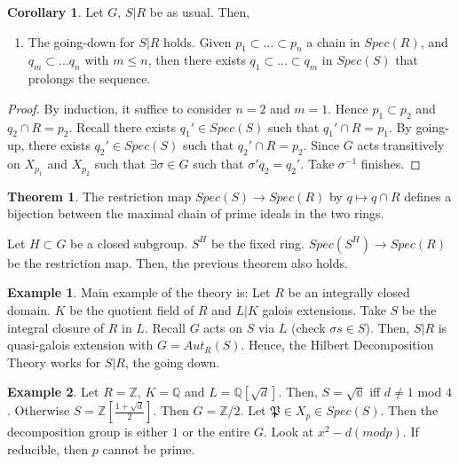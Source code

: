 \documentclass{article}
\theoremstyle{definition}
\newtheorem{theorem}{Theorem}[section]
\theoremstyle{definition}
\theoremstyle{definition}
\theoremstyle{definition}
\theoremstyle{definition}
\theoremstyle{definition}
\newtheorem{corollary}{Corollary}[theorem]
\theoremstyle{definition}
\newtheorem{example}{Example}[section]
\begin{document}
\begin{tcolorbox}[colback=green!5!white,colframe=green!30!white]
\begin{corollary}
Let $G$, $S|R$ be as usual. Then,
\begin{enumerate}
    \item The going-down for $S|R$ holds. Given $p_1\subset ...\subset p_n$ a chain in $Spec(R)$, and $q_m\subset ...q_n$ with $m\leq n$, then there exists $q_1\subset ... \subset q_m$ in $Spec(S)$ that prolongs the sequence. 
\end{enumerate}
\end{corollary}
\end{tcolorbox}
\begin{proof}
    By induction, it suffice to consider $n=2$ and $m=1$. Hence $p_1\subset p_2$ and $q_2\cap R=p_2$. Recall there exists $q_1'\in Spec(S)$ such that $q_1'\cap R=p_1$. By going-up, there exists $q_2'\in Spec(S)$ such that $q_2'\cap R=p_2$. Since $G$ acts transitively  on $X_{p_1}$ and $X_{p_2}$ such that $\exists \sigma\in G$ such that $\sigma'q_2=q_2'$. Take $\sigma ^{-1}$ finishes. 
\end{proof}


\begin{tcolorbox}[colback=red!5!white,colframe=red!30!white]
\begin{theorem}
The restriction map $Spec(S)\to Spec(R)$ by $q\mapsto q\cap R$ defines a bijection between the maximal chain of prime ideals in the two rings. 
\end{theorem}
\end{tcolorbox}

Let $H\subset G$ be a closed subgroup. $S^H$ be the fixed ring. $Spec(S^H)\to Spec(R)$ be the restriction map. Then, the previous theorem also holds. 


\begin{tcolorbox}[colback=yellow!5!white,colframe=yellow!30!white]
\begin{example}
Main example of the theory is: Let $R$ be an integrally closed domain. $K$ be the quotient field of $R$ and $L|K$ galois extensions. Take $S$ be the integral closure of $R$ in $L$. Recall $G$ acts on $S$ via $L$ (check $\sigma s\in S$). Then, $S|R$ is quasi-galois extension with $G=Aut_R(S)$. Hence, the Hilbert Decomposition Theory works for $S|R$, the going down. 
\end{example}
\end{tcolorbox}



\begin{tcolorbox}[colback=yellow!5!white,colframe=yellow!30!white]
\begin{example}
Let $R=\mathbb{Z}$, $K=\mathbb{Q}$ and $L=\mathbb{Q}[\sqrt{d}]$. Then, $S=\mathbb{\sqrt{d}}$ iff $d\neq 1$ mod $4$. Otherwise $S=\mathbb{Z}[\frac{1+\sqrt{d}}{2}]$.
Then $G=\mathbb{Z}/2$. Let $\mathfrak{P}\in X_p\in Spec(S)$. Then the decomposition group is either $1$ or the entire $G$. Look at $x^2-d(mod p)$. If reducible, then $p$ cannot be prime.

\end{example}
\end{tcolorbox}
\end{document}
